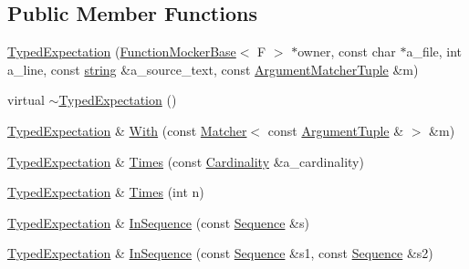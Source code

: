 \subsection*{Public Member Functions}
\begin{DoxyCompactItemize}
\item 
\hyperlink{classtesting_1_1internal_1_1TypedExpectation_a10bd0a8fa0db37215be42e1c61ccbc28}{Typed\+Expectation} (\hyperlink{classtesting_1_1internal_1_1FunctionMockerBase}{Function\+Mocker\+Base}$<$ F $>$ $\ast$owner, const char $\ast$a\+\_\+file, int a\+\_\+line, const \hyperlink{namespacetesting_1_1internal_a8e8ff5b11e64078831112677156cb111}{string} \&a\+\_\+source\+\_\+text, const \hyperlink{classtesting_1_1internal_1_1TypedExpectation_a8f10e3906761cc5c10fa3561c6e8938e}{Argument\+Matcher\+Tuple} \&m)
\item 
virtual \hyperlink{classtesting_1_1internal_1_1TypedExpectation_a4d73d7edd81f1b1418a33931fe728158}{$\sim$\+Typed\+Expectation} ()
\item 
\hyperlink{classtesting_1_1internal_1_1TypedExpectation}{Typed\+Expectation} \& \hyperlink{classtesting_1_1internal_1_1TypedExpectation_a4b25ec3d051e8551f3e213214b31c714}{With} (const \hyperlink{classtesting_1_1Matcher}{Matcher}$<$ const \hyperlink{classtesting_1_1internal_1_1TypedExpectation_a9a91379262d101f435809ba4556d14fa}{Argument\+Tuple} \& $>$ \&m)
\item 
\hyperlink{classtesting_1_1internal_1_1TypedExpectation}{Typed\+Expectation} \& \hyperlink{classtesting_1_1internal_1_1TypedExpectation_a9a4c34ee5c6e6adc880a22f61f33da57}{Times} (const \hyperlink{classtesting_1_1Cardinality}{Cardinality} \&a\+\_\+cardinality)
\item 
\hyperlink{classtesting_1_1internal_1_1TypedExpectation}{Typed\+Expectation} \& \hyperlink{classtesting_1_1internal_1_1TypedExpectation_a92d56ee785d38ec8193aed2a0fcbccf0}{Times} (int n)
\item 
\hyperlink{classtesting_1_1internal_1_1TypedExpectation}{Typed\+Expectation} \& \hyperlink{classtesting_1_1internal_1_1TypedExpectation_ada9e9081a98435991310ac60483d1230}{In\+Sequence} (const \hyperlink{classtesting_1_1Sequence}{Sequence} \&s)
\item 
\hyperlink{classtesting_1_1internal_1_1TypedExpectation}{Typed\+Expectation} \& \hyperlink{classtesting_1_1internal_1_1TypedExpectation_ac0f45c73e3f816796f6c5dea2dc70131}{In\+Sequence} (const \hyperlink{classtesting_1_1Sequence}{Sequence} \&s1, const \hyperlink{classtesting_1_1Sequence}{Sequence} \&s2)
\item 

\end{DoxyCompactItemize}
